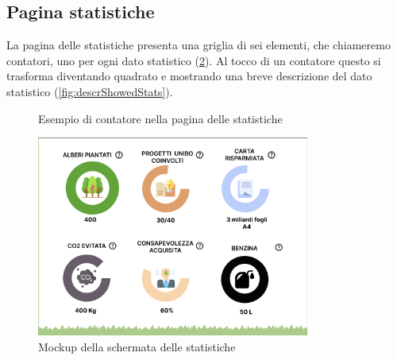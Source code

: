 \subsection{Pagina statistiche}
La pagina delle statistiche presenta una griglia di sei elementi, che chiameremo contatori, uno per ogni dato statistico (\ref{fig:statsPage}). Al tocco di un contatore questo si trasforma diventando quadrato e mostrando una breve descrizione del dato statistico (\ref{fig:descrShowedStats}).

\begin{figure} [h]
    \centering
    \caption{Esempio di contatore nella pagina delle statistiche}
    \label{fig:statCircle}
\end{figure}

\begin{figure}
    \includegraphics[width=0.8\textwidth]{img/statsPage.png}
    \caption{Mockup della schermata delle statistiche}
    \label{fig:statsPage}
\end{figure}
%
%
